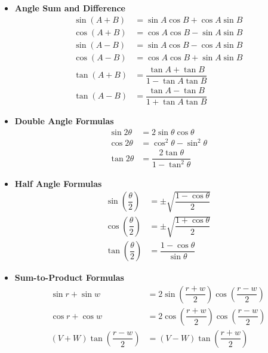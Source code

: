 \begin{itemize}
    \item \textbf{Angle Sum and Difference}
          \begin{align*}
              \sin(A + B) & = \sin A \cos B + \cos A \sin B              \\
              \cos(A + B) & = \cos A \cos B - \sin A \sin B              \\
              \sin(A - B) & = \sin A \cos B - \cos A \sin B              \\
              \cos(A - B) & = \cos A \cos B + \sin A \sin B              \\
              \tan(A + B) & = \dfrac{\tan A + \tan B}{1 - \tan A \tan B} \\
              \tan(A - B) & = \dfrac{\tan A - \tan B}{1 + \tan A \tan B}
          \end{align*}

    \item \textbf{Double Angle Formulas}
          \begin{align*}
              \sin 2\theta & = 2 \sin \theta \cos \theta                \\
              \cos 2\theta & = \cos^2 \theta - \sin^2 \theta            \\
              \tan 2\theta & = \dfrac{2 \tan \theta}{1 - \tan^2 \theta}
          \end{align*}

    \item \textbf{Half Angle Formulas}
          \begin{align*}
              \sin\left(\dfrac{\theta}{2}\right) & = \pm \sqrt{\dfrac{1 - \cos \theta}{2}} \\
              \cos\left(\dfrac{\theta}{2}\right) & = \pm \sqrt{\dfrac{1 + \cos \theta}{2}} \\
              \tan\left(\dfrac{\theta}{2}\right) & = \dfrac{1 - \cos \theta}{\sin \theta}
          \end{align*}

    \item \textbf{Sum-to-Product Formulas}
          \begin{align*}
              \sin r + \sin w                           & = 2 \sin\left(\dfrac{r + w}{2}\right) \cos\left(\dfrac{r - w}{2}\right) \\
              \cos r + \cos w                           & = 2 \cos\left(\dfrac{r + w}{2}\right) \cos\left(\dfrac{r - w}{2}\right) \\
              (V + W) \tan\left(\dfrac{r - w}{2}\right) & = (V - W) \tan\left(\dfrac{r + w}{2}\right)
          \end{align*}


\end{itemize}
